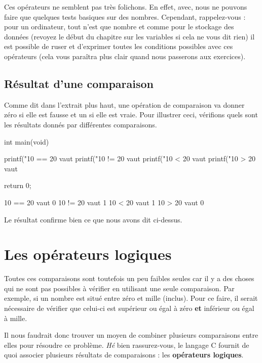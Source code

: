 Ces opérateurs ne semblent pas très folichons. En effet, avec, nous ne
pouvons faire que quelques tests basiques sur des nombres. Cependant,
rappelez-vous : pour un ordinateur, tout n'est que nombre et comme pour
le stockage des données (revoyez le début du chapitre sur les variables
si cela ne vous dit rien) il est possible de ruser et d'exprimer toutes
les conditions possibles avec ces opérateurs (cela vous paraîtra plus
clair quand nous passerons aux exercices).

\subsection{Résultat d'une comparaison}
\label{resultat-dune-comparaison}

Comme dit dans l'extrait plus haut, une opération de comparaison va
donner zéro si elle est fausse et un si elle est vraie. Pour illustrer
ceci, vérifions quels sont les résultats donnés par différentes
comparaisons.

\begin{C}
int main(void)
{
    printf("10 == 20 vaut %
    printf("10 != 20 vaut %
    printf("10 < 20 vaut %
    printf("10 > 20 vaut %

    return 0;
}
\end{C}

\begin{C}
10 == 20 vaut 0
10 != 20 vaut 1
10 < 20 vaut 1
10 > 20 vaut 0
\end{C}

Le résultat confirme bien ce que nous avons dit ci-dessus.
  
\section{Les opérateurs logiques}
\label{les-operateurs-logiques}

Toutes ces comparaisons sont toutefois un peu faibles seules car il y a
des choses qui ne sont pas possibles à vérifier en utilisant une seule
comparaison. Par exemple, si un nombre est situé entre zéro et mille
(inclus). Pour ce faire, il serait nécessaire de vérifier que celui-ci
est supérieur ou égal à zéro \textbf{et} inférieur ou égal à mille.

Il nous faudrait donc trouver un moyen de combiner plusieurs
comparaisons entre elles pour résoudre ce problème. \emph{Hé} bien
rassurez-vous, le langage C fournit de quoi associer plusieurs résultats
de comparaisons : les \textbf{opérateurs logiques}.


